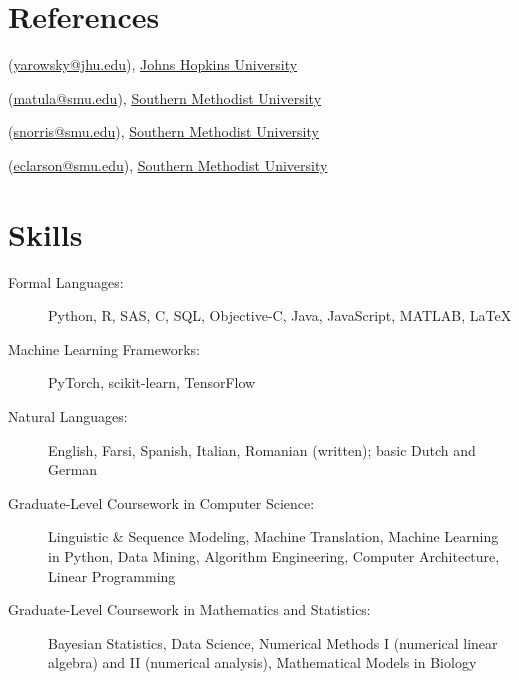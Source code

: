 \documentclass[margin, 10pt]{res} %
\newcommand{\CPP}
{C\nolinebreak[4]\hspace{-.05em}\raisebox{.22ex}{\footnotesize\bf ++}}
\newcommand{\JHU}{\href{https://www.jhu.edu/}{Johns Hopkins University}}
\newcommand{\SMU}{\href{https://www.smu.edu/}{Southern Methodist University}}
\begin{document}
\begin{resume}

\section{References}

\begin{description}[noitemsep]
\item[David Yarowsky] (\href{mailto:yarowsky@jhu.edu}{yarowsky@jhu.edu}), \JHU
\item[David W. Matula] (\href{mailto:matula@smu.edu}{matula@smu.edu}), \SMU
\item[Scott Norris] (\href{mailto:snorris@smu.edu}{snorris@smu.edu}), \SMU
\item[Eric C. Larson] (\href{mailto:eclarson@smu.edu}{eclarson@smu.edu}), \SMU
\end{description}


\section{Skills}

\begin{description}
\item[Formal Languages:] Python, R, SAS, \CPP, SQL, Objective-C, Java, JavaScript, MATLAB, \LaTeX
\item[Machine Learning Frameworks:] PyTorch, scikit-learn, TensorFlow
\item[Natural Languages:] English, Farsi, Spanish, Italian, Romanian (written); basic Dutch and German
\item[Graduate-Level Coursework in Computer Science:] Linguistic \& Sequence Modeling, Machine Translation, Machine Learning in Python, Data Mining, Algorithm Engineering, Computer Architecture, Linear Programming
\item[Graduate-Level Coursework in Mathematics and Statistics:] Bayesian Statistics, Data Science, Numerical Methods I (numerical linear algebra) and II (numerical analysis), Mathematical Models in Biology
\end{description}


\end{resume}
\end{document}
